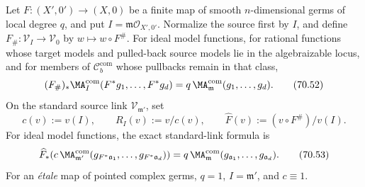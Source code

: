 \begin{proposition}\label{prop:local-cld-finite-map}
Let \(F:(X',0')\to(X,0)\) be a finite map of smooth \(n\)-dimensional germs
of local degree \(q\), and put \(I=\mathfrak m\mathcal O_{X',0'}\). Normalize
the source first by \(I\), and define
\(F_\#:\mathcal V_I\to\mathcal V_0\) by \(w\mapsto w\circ F^\#\). For ideal
model functions, for rational functions whose target models and pulled-back
source models lie in the algebraizable locus, and for members of
\(\mathcal C_b^{\mathrm{com}}\) whose pullbacks remain in that class,
\[
 (F_\#)_*\MA_I^{\mathrm{com}}(F^*g_1,\ldots,F^*g_d)
       =q\,\MA_{\mathfrak m}^{\mathrm{com}}(g_1,\ldots,g_d).
\tag{70.52}\label{eq:local-cld-finite-map}
\]
On the standard source link \(\mathcal V_{\mathfrak m'}\), set
\[
 c(v):=v(I),
 \qquad R_I(v):=v/c(v),
 \qquad \widehat F(v):=(v\circ F^\#)/v(I).
\]
For ideal model functions, the exact standard-link formula is
\[
 \widehat F_*\!\left(
 c\,\MA_{\mathfrak m'}^{\mathrm{com}}
   (g_{F^*\mathfrak a_1},\ldots,g_{F^*\mathfrak a_d})\right)
 =q\,\MA_{\mathfrak m}^{\mathrm{com}}
   (g_{\mathfrak a_1},\ldots,g_{\mathfrak a_d}).
\tag{70.53}\label{eq:local-cld-standard-link}
\]
For an \emph{\'etale} map of pointed complex germs, \(q=1\),
\(I=\mathfrak m'\), and \(c\equiv1\).
\end{proposition}

